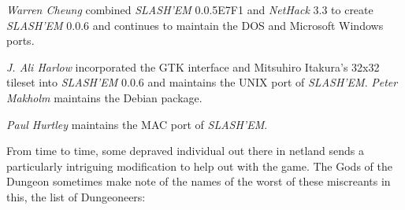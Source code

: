 
{\it Warren Cheung\/} combined {\it SLASH'EM\/} 0.0.5E7F1 and {\it NetHack\/} 3.3 to create
{\it SLASH'EM\/} 0.0.6 and continues to maintain the DOS and Microsoft Windows ports.

{\it J. Ali Harlow\/} incorporated the GTK interface and Mitsuhiro Itakura's
32x32 tileset into {\it SLASH'EM\/} 0.0.6 and maintains the UNIX port of {\it SLASH'EM}.
{\it Peter Makholm\/} maintains the Debian package.

{\it Paul Hurtley\/} maintains the MAC port of {\it SLASH'EM}.

			  \bigskip

From time to time, some depraved individual out there in netland sends a
particularly intriguing modification to help out with the game.  The Gods of
the Dungeon sometimes make note of the names of the worst of these miscreants
in this, the list of Dungeoneers:

